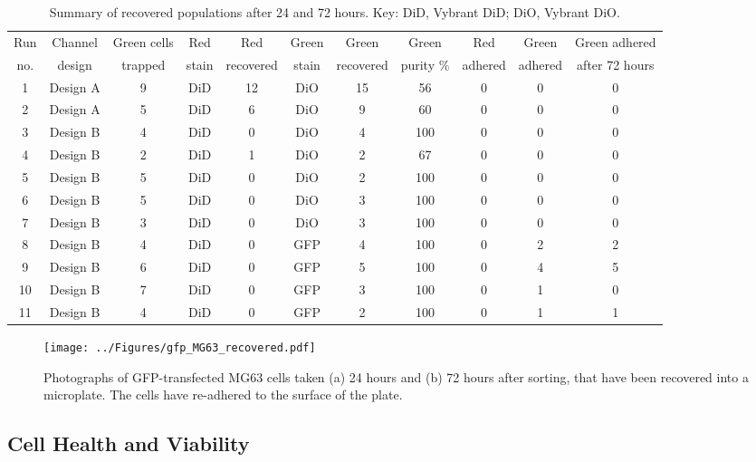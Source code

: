 \begin{sidewaystable}[p]
	\centering
		\begin{tabular} { c c c c c c c c c c c }
		\hline			
			Run & Channel & Green cells &	Red & Red & Green & Green & Green & Red & Green & Green adhered \\
			no. & design & trapped & stain & recovered & stain & recovered & purity $\%$ & adhered & adhered & after 72 hours \\
		\hline
			1 & Design A & 9 &	DiD &	12 &	DiO &	15 &	56 &	0 &	0 &	0 \\
			2	& Design A & 5 &	DiD &	6 &	DiO &	9 &	60 &	0 &	0 &	0 \\
			3 & Design B & 4 &	DiD &	0 &	DiO &	4 &	100 &	0 &	0 &	0 \\
			4	& Design B & 2 &	DiD &	1 &	DiO &	2 &	67 &	0 &	0 &	0 \\
			5 & Design B & 5 &	DiD	& 0	& DiO	& 2	& 100 &	0	& 0	& 0 \\
			6	& Design B & 5	& DiD	& 0	& DiO	& 3	& 100	& 0	& 0	& 0 \\
			7	& Design B & 3	& DiD	& 0	& DiO	& 3	& 100	& 0	& 0	& 0 \\
			8	& Design B & 4	& DiD	& 0	& GFP	& 4	& 100	& 0	& 2	& 2 \\
			9	& Design B & 6	& DiD	& 0	& GFP	& 5	& 100	& 0	& 4	& 5 \\
			10	& Design B & 7	& DiD	& 0	& GFP	& 3	& 100	& 0	& 1	& 0 \\
			11	& Design B & 4	& DiD	& 0	& GFP	& 2	& 100	& 0	& 1	& 1 \\
		\hline			
		\end{tabular}
	\caption[Summary of sorted and recovered populations of MG63 cells.]{Summary of recovered populations after 24 and 72 hours. Key: DiD, Vybrant DiD; DiO, Vybrant DiO.}
	\label{tab:recovered_MG63_populations}
\end{sidewaystable}

\begin{figure}
	\centering
		\texttt{[image: ../Figures/gfp\_MG63\_recovered.pdf]}
	\caption[GFP-transfected MG63 cells after sorting.]{Photographs of GFP-transfected MG63 cells taken (a) 24 hours and (b) 72 hours after sorting, that have been recovered into a microplate. The cells have re-adhered to the surface of the plate.}
	\label{fig:gfp_MG63_recovered}
\end{figure}

\subsection{Cell Health and Viability}


